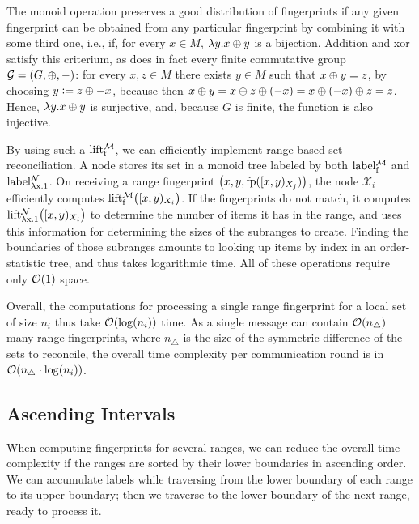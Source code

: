 \documentclass[conference]{IEEEtran}
\newcommand{\peer}[1]{\ensuremath{\mathcal{X}_{#1}}}
\begin{document}
The monoid operation preserves a good distribution of fingerprints if any given fingerprint can be obtained from any particular fingerprint by combining it with some third one, i.e., if, for every $x \in M$, $\lambda y.x \oplus y$ is a bijection. Addition and xor satisfy this criterium, as does in fact every finite commutative group $\mathcal{G} = (G, \oplus, -)$: for every $x, z \in M$ there exists $y \in M$ such that $x \oplus y = z$, by choosing $y \vcentcolon= z \oplus -x$, because then $x \oplus y = x \oplus z \oplus (-x) = x \oplus (-x) \oplus z = z$. Hence, $\lambda y.x \oplus y$ is surjective, and, because $G$ is finite, the function is also injective.

By using such a \somewhatmorphism{} $\operatorname{lift_{\operatorname{f}}^{\mathcal{M}}}$, we can efficiently implement range-based set reconciliation. A node stores its set in a monoid tree labeled by both $\operatorname{label_{\operatorname{f}}^{\mathcal{M}}}$ and $\operatorname{label_{\lambda x.1}^{\mathcal{N}}}$. On receiving a range fingerprint $\bigl({x}, {y}, {\operatorname{fp}([{x},{y})_{X_j})}\bigr)$, the node \peer{i} efficiently computes $\operatorname{lift_{\operatorname{f}}^{\mathcal{M}}}\bigl([{x},{y})_{X_i}\bigr)$. If the fingerprints do not match, it computes $\operatorname{lift_{\lambda x.1}^{\mathcal{N}}}\bigl([{x},{y})_{X_i}\bigr)$ to determine the number of items it has in the range, and uses this information for determining the sizes of the subranges to create. Finding the boundaries of those subranges amounts to looking up items by index in an order-statistic tree, and thus takes logarithmic time. All of these operations require only $\mathcal{O}(1)$ space.

Overall, the computations for processing a single range fingerprint for a local set of size $n_i$ thus take $\mathcal{O}(\log(n_i))$ time. As a single message can contain $\mathcal{O}(n_{\triangle})$ many range fingerprints, where $n_{\triangle}$ is the size of the symmetric difference of the sets to reconcile, the overall time complexity per communication round is in $\mathcal{O}(n_{\triangle} \cdot \log(n_i))$.

\subsection{Ascending Intervals}

When computing fingerprints for several ranges, we can reduce the overall time complexity if the ranges are sorted by their lower boundaries in ascending order. We can accumulate labels while traversing from the lower boundary of each range to its upper boundary; then we traverse to the lower boundary of the next range, ready to process it.
\end{document}
